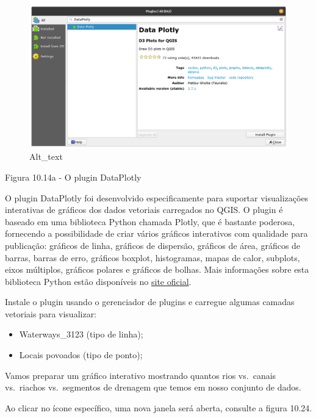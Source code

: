 \documentclass[
]{book}
\providecommand{\tightlist}{%
  \setlength{\itemsep}{0pt}\setlength{\parskip}{0pt}}
\begin{document}
\begin{figure}
\centering
\includegraphics{media/modulo10/fig1015_a.png}
\caption{Alt\_text}
\end{figure}

Figura 10.14a - O plugin DataPlotly

O plugin DataPlotly foi desenvolvido especificamente para suportar visualizações interativas de gráficos dos dados vetoriais carregados no QGIS. O plugin é baseado em uma biblioteca Python chamada Plotly, que é bastante poderosa, fornecendo a possibilidade de criar vários gráficos interativos com qualidade para publicação: gráficos de linha, gráficos de dispersão, gráficos de área, gráficos de barras, barras de erro, gráficos boxplot, histogramas, mapas de calor, subplots, eixos múltiplos, gráficos polares e gráficos de bolhas. Mais informações sobre esta biblioteca Python estão disponíveis no \href{https://plotly.com/python/}{site oficial}.

Instale o plugin usando o gerenciador de plugins e carregue algumas camadas vetoriais para visualizar:

\begin{itemize}
\tightlist
\item
  Waterways\_3123 (tipo de linha);
\item
  Locais povoados (tipo de ponto);
\end{itemize}

Vamos preparar um gráfico interativo mostrando quantos rios vs.~canais vs.~riachos vs.~segmentos de drenagem que temos em nosso conjunto de dados.

Ao clicar no ícone específico, uma nova janela será aberta, consulte a figura 10.24.
\end{document}
